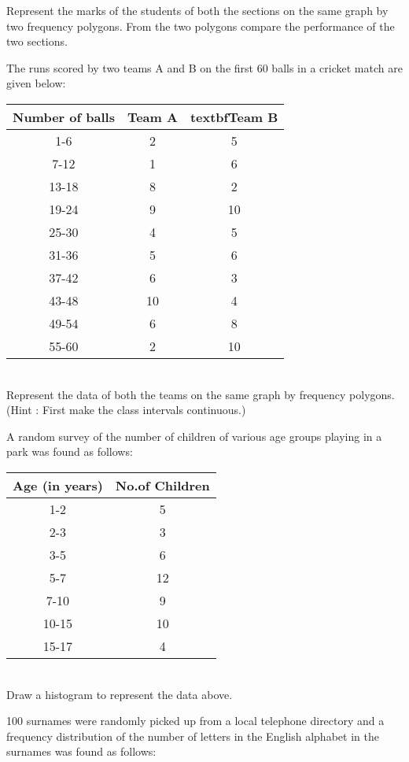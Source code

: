 Represent the marks of the students of both the sections on the same graph by two frequency polygons. From the two polygons compare the performance of the two sections.\\
\item The runs scored by two teams A and B on the first 60 balls in a cricket match are given below:\\

\begin{tabular}{|c|c|c|}
\hline
\textbf{Number of balls} &\textbf{Team A}  &textbf{Team B}\\
\hline
1-6 &2 &5\\
7-12 &1 &6\\
13-18 &8 &2\\
19-24 &9 &10\\
25-30 &4 &5\\
31-36 &5 &6\\
37-42 &6 &3\\
43-48 &10 &4\\
49-54 &6 &8\\
55-60 &2 &10\\
\hline
\end{tabular}\\

Represent the data of both the teams on the same graph by frequency polygons.\\
(Hint : First make the class intervals continuous.)\\
\item A random survey of the number of children of various age groups playing in a park was found as follows:\\

\begin{tabular}{|c|c|}
\hline
\textbf{Age (in years)} &\textbf{No.of Children}\\
\hline
1-2 &5\\
2-3 &3\\
3-5 &6\\
5-7 &12\\
7-10 &9\\
10-15 &10\\
15-17 &4\\
\hline
\end{tabular}\\

Draw a histogram to represent the data above.\\
\item 100 surnames were randomly picked up from a local telephone directory and a frequency distribution of the number of letters in the English alphabet in the surnames was found as follows:\\

